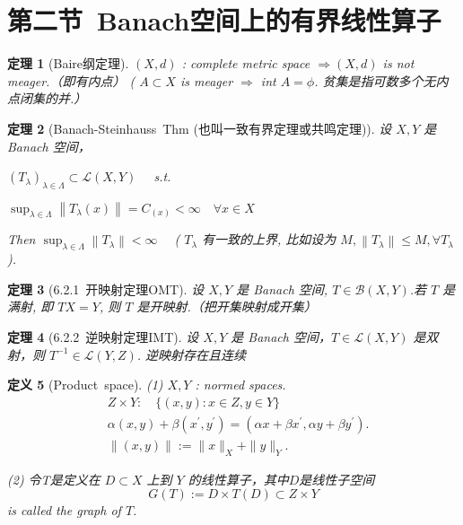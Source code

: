 \documentclass[10pt,openany]{book}
\theoremstyle{thmstyle} %
\newtheorem{theorem}{定理}[chapter]
\theoremstyle{defstyle} %
\newtheorem{definition}[theorem]{定义}
\theoremstyle{prostyle} %
\begin{document}
\section{第二节~Banach空间上的有界线性算子}

\begin{theorem}[Baire纲定理]
$(X, d)$ : complete metric space $\Rightarrow (X, d)$ is not meager.（即有内点）
( $A \subset X$ is meager $\Rightarrow$ int $A=\phi$. 贫集是指可数多个无内点闭集的并.）
\end{theorem}

\begin{theorem}[Banach-Steinhauss~Thm (也叫一致有界定理或共鸣定理)]
设 $X, Y$ 是 Banach 空间，

$\left(T_\lambda\right)_{\lambda \in \Lambda} \subset \mathcal{L}(X, Y) \quad$ s.t.

$\sup_{\lambda \in \Lambda}\left\|T_\lambda(x)\right\|=C_{(x)} <\infty \quad \forall x \in X$

Then $\sup_{\lambda \in \Lambda} \left\|T_\lambda\right\|<\infty \quad$ ( $T_\lambda$ 有一致的上界, 比如设为 $M,\left\|T_\lambda\right\| \leq M, \forall T_\lambda$ ).
\end{theorem}


\begin{theorem}[6.2.1~开映射定理OMT]
设 $X, Y$ 是 Banach 空间, $T \in \mathcal{B}(X, Y)$.若 $T$ 是满射, 即 $T X=Y$, 则 $T$ 是开映射.（把开集映射成开集）
\end{theorem}

\begin{theorem}[6.2.2~逆映射定理IMT]
设 $X, Y$ 是 Banach 空间，$T \in \mathcal{L}(X, Y)$ 是双射，则 $T^{-1} \in \mathcal{L}(Y, Z)$. 逆映射存在且连续
\end{theorem}



\begin{definition}[Product~space]

(1) $X, Y$ : normed spaces.
$$
\begin{aligned}
& Z \times Y: \quad\{(x, y): x \in Z, y \in Y\} \\
& \alpha(x, y)+\beta\left(x^{\prime}, y^{\prime}\right)=\left( \alpha x+\beta x^{\prime}, \alpha y+\beta y^{\prime}\right) . \\
& \|(x, y)\|:=\|x\|_X+\|y\|_Y .
\end{aligned}
$$

(2) 令T是定义在 $D\subset X$ 上到 $Y$ 的线性算子，其中$D$是线性子空间
$$
G(T):=D \times T(D) \subset Z \times Y
$$
is called the graph of $T$.
\end{definition}
\end{document}
